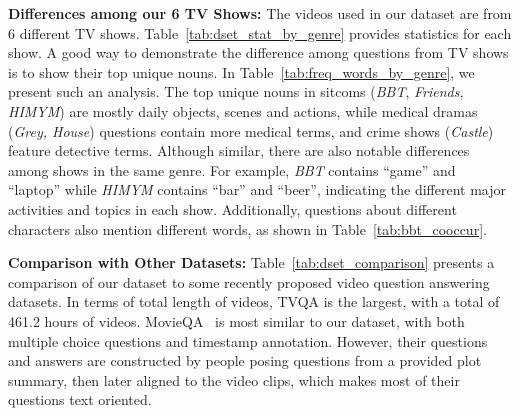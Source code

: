 \documentclass[11pt,a4paper]{article}
\begin{document}
\noindent\textbf{Differences among our 6 TV Shows:} The videos used in our dataset are from 6 different TV shows. Table~\ref{tab:dset_stat_by_genre} provides statistics for each show. A good way to demonstrate the difference among questions from TV shows is to show their top unique nouns. 
In Table~\ref{tab:freq_words_by_genre}, we present such an analysis. The top unique nouns in sitcoms (\textit{BBT}, \textit{Friends}, \textit{HIMYM}) are mostly daily objects, scenes and actions, while medical dramas (\textit{Grey, House}) questions contain more medical terms, and crime shows (\textit{Castle}) feature detective terms. Although similar, there are also notable differences among shows in the same genre. For example, \textit{BBT} contains ``game'' and ``laptop''  while \textit{HIMYM} contains ``bar'' and ``beer'', indicating the different major activities and topics in each show.
Additionally, questions about different characters also mention different words, as shown in Table~\ref{tab:bbt_cooccur}.


\noindent\textbf{Comparison with Other Datasets:}
Table~\ref{tab:dset_comparison} presents a comparison of our dataset to some recently proposed video question answering datasets. In terms of total length of videos, TVQA is the largest, with a total of 461.2 hours of videos. 
MovieQA~\citep{Tapaswi2016MovieQAUS} is most similar to our dataset, with both multiple choice questions and timestamp annotation. 
However, their questions and answers are constructed by people posing questions from a provided plot summary, then later aligned to the video clips, which makes most of their questions text oriented. 


\begin{table}[t]
\small
\centering
{}
\caption{Human accuracy on test-public set based on different sources. As expected, humans get the best performance when given both videos and subtitles.}
\label{tab:human_acc}
\vspace{-5pt}
\end{table}
\end{document}
